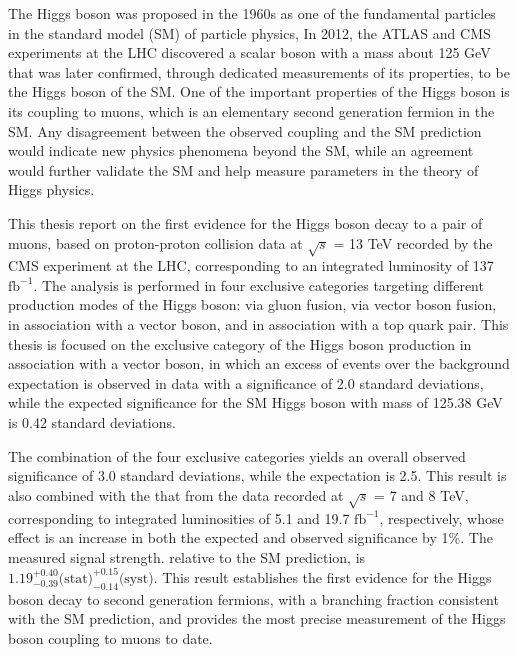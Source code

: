 The Higgs boson was proposed in the 1960s as one of the fundamental particles in the standard model (SM) of particle physics,
In 2012, the ATLAS and CMS experiments at the LHC discovered a scalar boson with a mass about 125 GeV 
that was later confirmed, through dedicated measurements of its properties, to be the Higgs boson of the SM.
One of the important properties of the Higgs boson is its coupling to muons, 
which is an elementary second generation fermion in the SM.
Any disagreement between the observed coupling and the SM prediction would indicate new physics phenomena beyond the SM,
while an agreement would further validate the SM and help measure parameters in the theory of Higgs physics.

This thesis report on the first evidence for the Higgs boson decay to a pair of muons,
based on proton-proton collision data at $\sqrt{s}$ = 13 TeV recorded by the CMS experiment at the LHC, 
corresponding to an integrated luminosity of 137 $\text{fb}^{-1}$.
The analysis is performed in four exclusive categories targeting different production modes of the Higgs boson:
via gluon fusion, via vector boson fusion, in association with a vector boson, and in association with a top quark pair.
This thesis is focused on the exclusive category of the Higgs boson production in association with a vector boson,
in which an excess of events over the background expectation is observed in data with a significance of 2.0 standard deviations,
while the expected significance for the SM Higgs boson with mass of 125.38 GeV is 0.42 standard deviations.

The combination of the four exclusive categories yields an overall observed significance of 3.0 standard deviations, while the expectation is 2.5.
This result is also combined with the that from the data recorded at $\sqrt{s}$ = 7 and 8 TeV, 
corresponding to integrated luminosities of 5.1 and 19.7 $\text{fb}^{-1}$, respectively,
whose effect is an increase in both the expected and observed significance by 1\%.
The measured signal strength. relative to the SM prediction, is $1.19^{+0.40}_{-0.39} \text{(stat)}^{+0.15}_{-0.14} \text{(syst)}$.
This result establishes the first evidence for the Higgs boson decay to second generation fermions, with a branching fraction consistent with the SM prediction, 
and provides the most precise measurement of the Higgs boson coupling to muons to date.